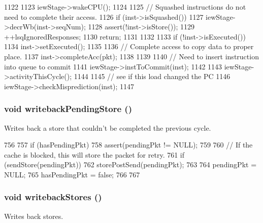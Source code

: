 \begin{DoxyCode}
1122 {
1123     iewStage->wakeCPU();
1124 
1125     // Squashed instructions do not need to complete their access.
1126     if (inst->isSquashed()) {
1127         iewStage->decrWb(inst->seqNum);
1128         assert(!inst->isStore());
1129         ++lsqIgnoredResponses;
1130         return;
1131     }
1132 
1133     if (!inst->isExecuted()) {
1134         inst->setExecuted();
1135 
1136         // Complete access to copy data to proper place.
1137         inst->completeAcc(pkt);
1138     }
1139 
1140     // Need to insert instruction into queue to commit
1141     iewStage->instToCommit(inst);
1142 
1143     iewStage->activityThisCycle();
1144 
1145     // see if this load changed the PC
1146     iewStage->checkMisprediction(inst);
1147 }
\end{DoxyCode}
\hypertarget{classLSQUnit_a173d8fd73280b1cf5b4d0dd9b68cf0cf}{
\subsubsection[{writebackPendingStore}]{\setlength{\rightskip}{0pt plus 5cm}void writebackPendingStore ()}}
\label{classLSQUnit_a173d8fd73280b1cf5b4d0dd9b68cf0cf}
Writes back a store that couldn't be completed the previous cycle. 


\begin{DoxyCode}
756 {
757     if (hasPendingPkt) {
758         assert(pendingPkt != NULL);
759 
760         // If the cache is blocked, this will store the packet for retry.
761         if (sendStore(pendingPkt)) {
762             storePostSend(pendingPkt);
763         }
764         pendingPkt = NULL;
765         hasPendingPkt = false;
766     }
767 }
\end{DoxyCode}
\hypertarget{classLSQUnit_a5f04e29d6f6feb8b86460491f2ba7547}{
\subsubsection[{writebackStores}]{\setlength{\rightskip}{0pt plus 5cm}void writebackStores ()}}
\label{classLSQUnit_a5f04e29d6f6feb8b86460491f2ba7547}
Writes back stores. 


